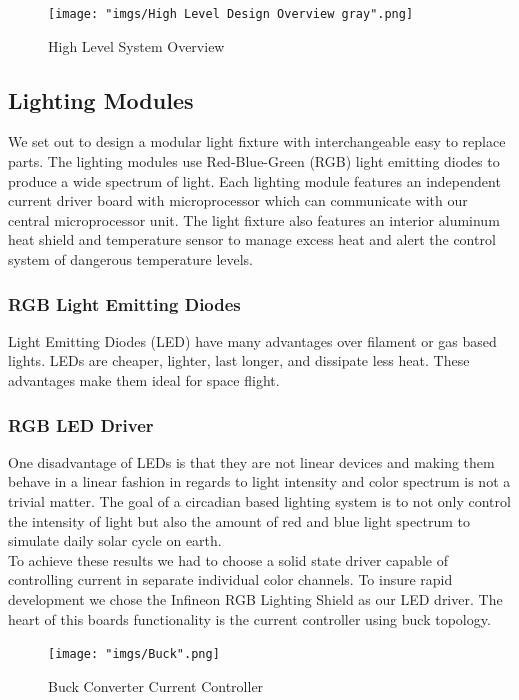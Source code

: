 \documentclass[12pt,a4paper]{report}
\begin{document}
\begin{figure}[H]
	\centering
	\texttt{[image: "imgs/High Level Design Overview gray".png]}\par			\vspace{0.1cm}
	\caption{High Level System Overview}
\end{figure}
\subsection{Lighting Modules}
We set out to design a modular light fixture with interchangeable easy to replace parts. The lighting modules use Red-Blue-Green (RGB) light emitting diodes to produce a wide spectrum of light. Each lighting module features an independent current driver board with microprocessor which can communicate with our central microprocessor unit. The light fixture also features an interior aluminum heat shield and temperature sensor to manage excess heat and alert the control system of dangerous temperature levels. 
 
\subsubsection{RGB Light Emitting Diodes}
Light Emitting Diodes (LED) have many advantages over filament or gas based lights. LEDs are cheaper, lighter, last longer, and dissipate less heat. These advantages make them ideal for space flight.   

\subsubsection{RGB LED Driver}
One disadvantage of LEDs is that they are not linear devices and making them behave in a linear fashion in regards to light intensity and color spectrum is not a trivial matter. The goal of a circadian based lighting system is to not only control the intensity of light but also the amount of red and blue light spectrum to simulate daily solar cycle on earth. \\ \linebreak 
To achieve these results we had to choose a solid state driver capable of controlling current in separate individual color channels. To insure rapid development we chose the Infineon RGB Lighting Shield as our LED driver. The heart of this boards functionality is the current controller using buck topology. 

\begin{figure}[H]
	\centering
	\texttt{[image: "imgs/Buck".png]}\par			
	\vspace{0.1cm}
	\caption{Buck Converter Current Controller}
	\label{fig:Buck}
\end{figure}
\end{document}

